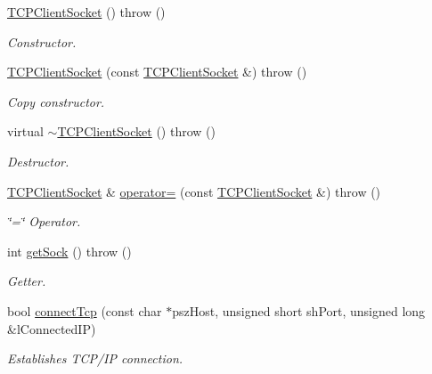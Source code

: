 \begin{DoxyCompactItemize}
\item 
\hyperlink{class_l_s_t_d_a_q_1_1_l_i_b_1_1_t_c_p_client_socket_a7175ecb244181ab5d99cbb399e7ab088}{T\+C\+P\+Client\+Socket} ()  throw ()
\begin{DoxyCompactList}\small\item\em Constructor. \end{DoxyCompactList}\item 
\hyperlink{class_l_s_t_d_a_q_1_1_l_i_b_1_1_t_c_p_client_socket_a1b0d5399d0ef18b30977ebb7475c4b11}{T\+C\+P\+Client\+Socket} (const \hyperlink{class_l_s_t_d_a_q_1_1_l_i_b_1_1_t_c_p_client_socket}{T\+C\+P\+Client\+Socket} \&)  throw ()
\begin{DoxyCompactList}\small\item\em Copy constructor. \end{DoxyCompactList}\item 
virtual \hyperlink{class_l_s_t_d_a_q_1_1_l_i_b_1_1_t_c_p_client_socket_a96bec52de4a6e69c491b6cf089e195ac}{$\sim$\+T\+C\+P\+Client\+Socket} ()  throw ()
\begin{DoxyCompactList}\small\item\em Destructor. \end{DoxyCompactList}\item 
\hyperlink{class_l_s_t_d_a_q_1_1_l_i_b_1_1_t_c_p_client_socket}{T\+C\+P\+Client\+Socket} \& \hyperlink{class_l_s_t_d_a_q_1_1_l_i_b_1_1_t_c_p_client_socket_a8bd417c4938eac0a20293fada51ab361}{operator=} (const \hyperlink{class_l_s_t_d_a_q_1_1_l_i_b_1_1_t_c_p_client_socket}{T\+C\+P\+Client\+Socket} \&)  throw ()
\begin{DoxyCompactList}\small\item\em \char`\"{}=\char`\"{} Operator. \end{DoxyCompactList}\item 
int \hyperlink{class_l_s_t_d_a_q_1_1_l_i_b_1_1_t_c_p_client_socket_a7356e597b5384977aca499000858e62e}{get\+Sock} ()  throw ()
\begin{DoxyCompactList}\small\item\em Getter. \end{DoxyCompactList}\item 
bool \hyperlink{class_l_s_t_d_a_q_1_1_l_i_b_1_1_t_c_p_client_socket_aa1cabc1a3e1524013202e70b5b617bb6}{connect\+Tcp} (const char $\ast$psz\+Host, unsigned short sh\+Port, unsigned long \&l\+Connected\+I\+P)
\begin{DoxyCompactList}\small\item\em Establishes T\+C\+P/\+I\+P connection. \end{DoxyCompactList}\item 

\end{DoxyCompactItemize}
